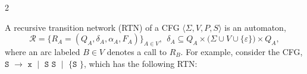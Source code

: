 \documentclass[portrait,a0b,final,a4resizeable]{a0poster}
\newcommand{\jointspacing}{\vspace{0.3in}}
\begin{document}
\begin{poster}
\begin{multicols}{2}
    \jointspacing


\null\hspace*{2.8cm}\begin{minipage}[c]{0.87\columnwidth}
  A recursive transition network (RTN) of a CFG $\langle \Sigma,V, P, S\rangle$ is an automaton,
  \[
    \mathcal R=\big\{R_A=(Q_A,\delta_A,\alpha_A,F_A)\big\}_{A\in V},
    \:\:
    \delta_A\subseteq Q_A\times\big(\Sigma\cup V\cup\{\varepsilon\}\big)\times Q_A,
  \]
  where an arc labeled \(B\in V\) denotes a call to \(R_B\). For example, consider the CFG, $\texttt{S } \rightarrow \texttt{ x } \mid \texttt{ S S } \mid \texttt{ \{ S \}}$, which has the following RTN:\vspace{0.6cm}


  \begin{center}
    \hspace{-3cm}
    
  \end{center}



\end{minipage}
\end{multicols}
\end{poster}
\end{document}

